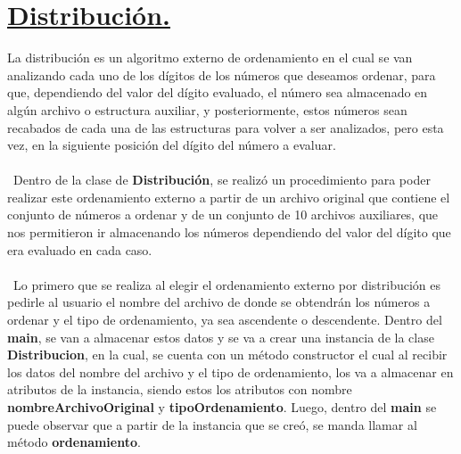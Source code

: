\documentclass[12pt,letterpaper]{report}
\begin{document}
\section*{\centering \underline{Distribución.}}
La distribución es un algoritmo externo de ordenamiento en el cual se van analizando cada uno de los dígitos de los números que deseamos ordenar, para que, dependiendo del valor del dígito evaluado, el número sea almacenado en algún archivo o estructura auxiliar, y posteriormente, estos números sean recabados de cada una de las estructuras para volver a ser analizados, pero esta vez, en la siguiente posición del dígito del número a evaluar.\\\\\
Dentro de la clase de \textbf{Distribución}, se realizó un procedimiento para poder realizar este ordenamiento externo a partir de un archivo original que contiene el conjunto de números a ordenar y de un conjunto de 10 archivos auxiliares, que nos permitieron ir almacenando los números dependiendo del valor del dígito que era evaluado en cada caso.\\\\\
Lo primero que se realiza al elegir el ordenamiento externo por distribución es pedirle al usuario el nombre del archivo de donde se obtendrán los números a ordenar y el tipo de ordenamiento, ya sea ascendente o descendente. Dentro del \textbf{main}, se van a almacenar estos datos y se va a crear una instancia de la clase \textbf{Distribucion}, en la cual, se cuenta con un método constructor el cual al recibir los datos del nombre del archivo y el tipo de ordenamiento, los va a almacenar en atributos de la instancia, siendo estos los atributos con nombre \textbf{nombreArchivoOriginal} y \textbf{tipoOrdenamiento}. Luego, dentro del \textbf{main} se puede observar que a partir de la instancia que se creó, se manda llamar al método \textbf{ordenamiento}.\\\\\
\end{document}
